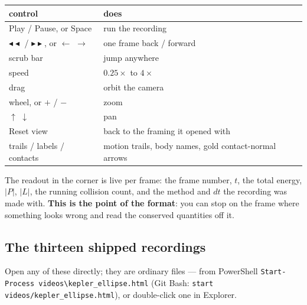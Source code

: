 \documentclass[11pt]{article}
\newcommand{\code}[1]{\texttt{#1}}
\begin{document}
\begin{center}
\begin{tabular}{ll}
\textbf{control} & \textbf{does}\\\hline
Play / Pause, or Space & run the recording\\
$\blacktriangleleft\blacktriangleleft$ / $\blacktriangleright\blacktriangleright$, or $\leftarrow$ $\rightarrow$ & one frame back / forward\\
scrub bar & jump anywhere\\
speed & $0.25\times$ to $4\times$\\
drag & orbit the camera\\
wheel, or $+$ / $-$ & zoom\\
$\uparrow$ $\downarrow$ & pan\\
Reset view & back to the framing it opened with\\
trails / labels / contacts & motion trails, body names, gold contact-normal arrows\\
\end{tabular}
\end{center}

The readout in the corner is live per frame: the frame number, $t$, the
total energy, $|P|$, $|L|$, the running collision count, and the method
and $dt$ the recording was made with. \textbf{This is the point of the
format}: you can stop on the frame where something looks wrong and read
the conserved quantities off it.

\subsection{The thirteen shipped recordings}

Open any of these directly; they are ordinary files --- from PowerShell
\code{Start-Process videos\textbackslash{}kepler\_ellipse.html} (Git Bash:
\code{start videos/kepler\_ellipse.html}), or double-click one in
Explorer.
\end{document}
